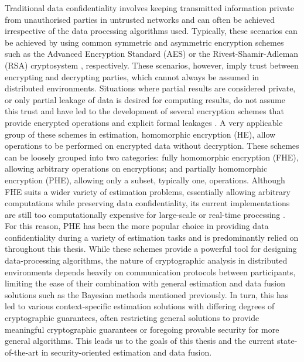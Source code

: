 Traditional data confidentiality involves keeping transmitted information private from unauthorised parties in untrusted networks and can often be achieved irrespective of the data processing algorithms used. Typically, these scenarios can be achieved by using common symmetric and asymmetric encryption schemes such as the Advanced Encryption Standard (AES) \cite{gueronIntelAdvancedEncryption2010} or the Rivest-Shamir-Adleman (RSA) cryptosystem \cite{rivestMethodObtainingDigital1978}, respectively. These scenarios, however, imply trust between encrypting and decrypting parties, which cannot always be assumed in distributed environments. Situations where partial results are considered private, or only partial leakage of data is desired for computing results, do not assume this trust and have led to the development of several encryption schemes that provide encrypted operations and explicit formal leakages \cite{paillierPublicKeyCryptosystemsBased1999,shiPrivacyPreservingAggregationTimeSeries2011,chotardDecentralizedMultiClientFunctional2018,andresGeoIndistinguishabilityDifferentialPrivacy2013}. A very applicable group of these schemes in estimation, homomorphic encryption (HE), allow operations to be performed on encrypted data without decryption. These schemes can be loosely grouped into two categories: fully homomorphic encryption (FHE), allowing arbitrary operations on encryptions; and partially homomorphic encryption (PHE), allowing only a subset, typically one, operations. Although FHE suits a wider variety of estimation problems, essentially allowing arbitrary computations while preserving data confidentiality, its current implementations are still too computationally expensive for large-scale or real-time processing \cite{acarSurveyHomomorphicEncryption2018,gentryFullyHomomorphicEncryption2009,stehleFasterFullyHomomorphic2010}. For this reason, PHE has been the more popular choice in providing data confidentiality during a variety of estimation tasks \cite{lagendijkEncryptedSignalProcessing2012,ryanPretVoterPaillier2008,kerschbaumOutsourcedPrivateSet2012,catalanoUsingLinearlyHomomorphicEncryption2015,abdallaSingleInputMulticlientInnerProduct2019} and is predominantly relied on throughout this thesis. While these schemes provide a powerful tool for designing data-processing algorithms, the nature of cryptographic analysis in distributed environments depends heavily on communication protocols between participants, limiting the ease of their combination with general estimation and data fusion solutions such as the Bayesian methods mentioned previously. In turn, this has led to various context-specific estimation solutions with differing degrees of cryptographic guarantees, often restricting general solutions to provide meaningful cryptographic guarantees or foregoing provable security for more general algorithms. This leads us to the goals of this thesis and the current state-of-the-art in security-oriented estimation and data fusion.


